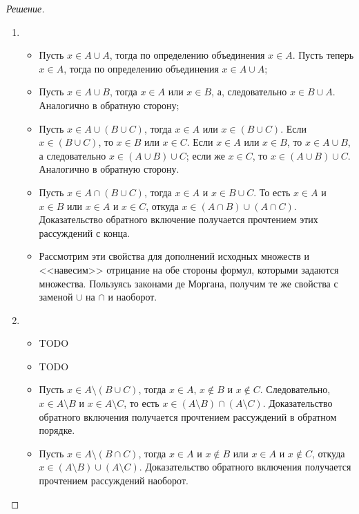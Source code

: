     \begin{proof}[Решение]
        \begin{enumerate}[label=(\alph{*})]
            \item \begin{itemize}
                \item Пусть \(x \in A \cup A\), тогда по определению объединения \(x \in A\). Пусть теперь \(x \in A\), тогда по определению объединения \(x \in A \cup A\);
                \item Пусть \(x \in A \cup B\), тогда \(x \in A\) или \(x \in B\), а, следовательно \(x \in B \cup A\). Аналогично в обратную сторону;
                \item Пусть \(x \in A \cup (B \cup C)\), тогда \(x \in A\) или \(x \in (B \cup C)\). Если \(x \in (B \cup C)\), то \(x \in B\) или \(x \in C\). Если \(x \in A\) или \(x \in B\), то \(x \in A \cup B\), а следовательно \(x \in (A \cup B) \cup C\); если же \(x \in C\), то \(x \in (A \cup B) \cup C\). Аналогично в обратную сторону.
                \item Пусть \(x \in A \cap (B \cup C)\), тогда \(x \in A\) и \(x \in B \cup C\). То есть \(x \in A\) и \(x \in B\) или \(x \in A\) и \(x \in C\), откуда \(x \in (A \cap B) \cup (A \cap C)\). Доказательство обратного включение получается прочтением этих рассуждений с конца.
                \item Рассмотрим эти свойства для дополнений исходных множеств и <<навесим>> отрицание на обе стороны формул, которыми задаются множества. Пользуясь законами де Моргана, получим те же свойства с заменой \(\cup\) на \(\cap\) и наоборот.
            \end{itemize}
            \item \begin{itemize}
                \item TODO
                \item TODO
                \item Пусть \(x \in A \setminus (B \cup C)\), тогда \(x \in A\), \(x \not \in B\) и \(x \not \in C\). Следовательно, \(x \in A \setminus B\) и \(x \in A \setminus C\), то есть \(x \in (A \setminus B) \cap (A \setminus C)\). Доказательство обратного включения получается прочтением рассуждений в обратном порядке.
                \item Пусть \(x \in A \setminus (B \cap C)\), тогда \(x \in A\) и \(x \not \in B\) или \(x \in A\) и \(x \not \in C\), откуда \(x \in (A \setminus B) \cup (A \setminus C)\). Доказательство обратного включения получается прочтением рассуждений наоборот.

\end{itemize}
\end{enumerate}
\end{proof}
